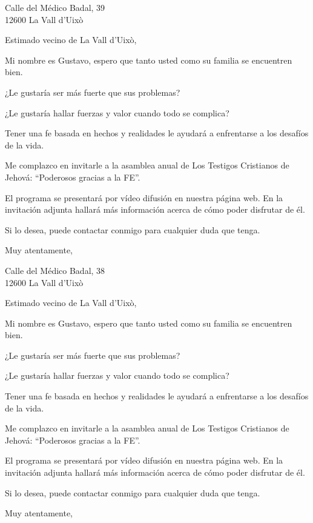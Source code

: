 \documentclass{scrlttr2}
\begin{document}
\begin{letter}{%
Calle del Médico Badal, 39\\
12600 La Vall d'Uixò\\
}
\opening{Estimado vecino de La Vall d'Uixò,}

Mi nombre es Gustavo, espero que tanto usted como su familia se encuentren bien.

¿Le gustaría ser más fuerte que sus problemas?

¿Le gustaría hallar fuerzas y valor cuando todo se complica?

Tener una fe basada en hechos y realidades le ayudará a enfrentarse a los desafíos de la vida.

Me complazco en invitarle a la asamblea anual de Los Testigos Cristianos de Jehová: ``Poderosos gracias a la FE''.

El programa se presentará por vídeo difusión en nuestra página web. En la invitación adjunta hallará más información acerca de cómo poder disfrutar de él.

Si lo desea, puede contactar conmigo para cualquier duda que tenga.

\closing{Muy atentamente,}


\end{letter}
\begin{letter}{%
Calle del Médico Badal, 38\\
12600 La Vall d'Uixò\\
}
\opening{Estimado vecino de La Vall d'Uixò,}

Mi nombre es Gustavo, espero que tanto usted como su familia se encuentren bien.

¿Le gustaría ser más fuerte que sus problemas?

¿Le gustaría hallar fuerzas y valor cuando todo se complica?

Tener una fe basada en hechos y realidades le ayudará a enfrentarse a los desafíos de la vida.

Me complazco en invitarle a la asamblea anual de Los Testigos Cristianos de Jehová: ``Poderosos gracias a la FE''.

El programa se presentará por vídeo difusión en nuestra página web. En la invitación adjunta hallará más información acerca de cómo poder disfrutar de él.

Si lo desea, puede contactar conmigo para cualquier duda que tenga.

\closing{Muy atentamente,}


\end{letter}
\end{document}
